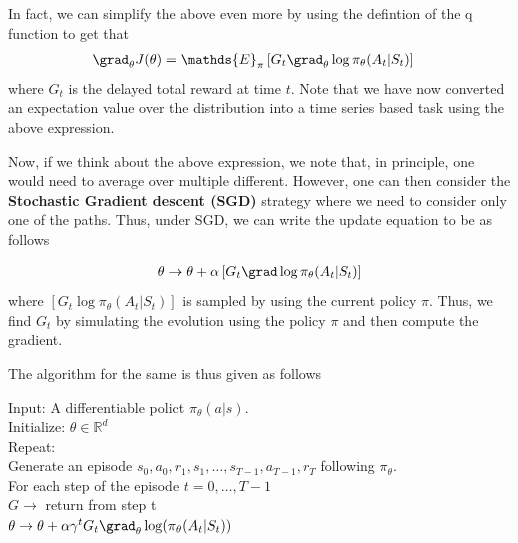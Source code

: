 In fact, we can simplify the above even more by using the defintion of the q function to get that 
\begin{align}
    \grad_{\theta} J(\theta) &=  \mathds{E}_{\pi}\left[G_t \grad_{\theta} \log{\pi_\theta(A_t|S_t)} \right]
\end{align}
where $G_t$ is the delayed total reward at time $t$. Note that we have now converted an expectation value over the distribution into a time series based task using the above expression. 

\begin{tcolorbox}[title=Sutton algorithm,breakable]
Now, if we think about the above expression, we note that, in principle, one would need to average over multiple different. However, one can then consider the \textbf{Stochastic Gradient descent (SGD)} strategy where we need to consider only one of the paths. Thus, under SGD, we can write the update equation to be as follows 
\begin{tcolorbox}[title= Update equation,breakable]
    \begin{align}
        \theta \rightarrow \theta + \alpha \left[ G_t \grad\log{\pi_\theta(A_t|S_t)}\right]
    \end{align}    
    where $\left[ G_t \log{\pi_\theta(A_t|S_t)}\right]$ is sampled by using the current policy $\pi$. Thus, we find $G_t$ by simulating the evolution using the policy $\pi$ and then compute the gradient.   
\end{tcolorbox}
The algorithm for the same is thus given as follows
\begin{tcolorbox}[title = Algorithm,breakable]
    Input: A differentiable polict $\pi_{\theta}(a|s)$.\\
    Initialize: $\theta \in \mathds{R}^d$\\
    Repeat:\\
    \null\quad Generate an episode $s_0,a_0,r_1,s_1,\ldots,s_{T-1},a_{T-1},r_T$ following $\pi_{\theta}$. \\
    \null\quad For each step of the episode $t=0,\ldots,T-1$ \\
    \null\quad$G\rightarrow $ return from step t \\
    \null\quad$\theta \rightarrow \theta + \alpha \gamma^t G_{t}\grad_{\theta} \log( \pi_{\theta}(A_t|S_t))$
\end{tcolorbox}
    
\end{tcolorbox}

